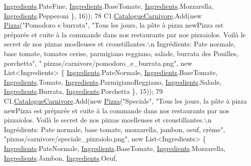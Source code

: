 \begin{DoxyCode}
      \hyperlink{namespaceModele_a001a8e89e56a724f24a249ba98080d41}{Ingredients}.PateFine, \hyperlink{namespaceModele_a001a8e89e56a724f24a249ba98080d41}{Ingredients}.BaseTomate, \hyperlink{namespaceModele_a001a8e89e56a724f24a249ba98080d41}{Ingredients}.Mozzarella, 
      \hyperlink{namespaceModele_a001a8e89e56a724f24a249ba98080d41}{Ingredients}.Pepperoni \}, 16));
78             C1.\hyperlink{classModele_1_1Catalogue_a4af9ef768f67cef6dfe545e22a6d63af}{CatalogueCarnivore}.Add(\textcolor{keyword}{new} \hyperlink{classModele_1_1Pizza}{Pizza}(\textcolor{stringliteral}{"Pomodoro e burrata"}, \textcolor{stringliteral}{"Tous les
       jours, la pâte à pizza newPizza est préparée et cuite à la commande dans nos restaurants par nos pizzaiolos.
       Voilà le secret de nos pizzas moelleuses et croustillantes.\(\backslash\)n Ingrédients: Pate normale, base tomate, tomates
       cerise, parmigiano reggiano, salade, burrata des Pouilles, porchetta"}, \textcolor{stringliteral}{"
      pizzas/carnivore/pomodoro\_e\_burrata.png"}, \textcolor{keyword}{new} List<Ingredients> \{ \hyperlink{namespaceModele_a001a8e89e56a724f24a249ba98080d41}{Ingredients}.PateNormale, \hyperlink{namespaceModele_a001a8e89e56a724f24a249ba98080d41}{Ingredients}.BaseTomate, 
      \hyperlink{namespaceModele_a001a8e89e56a724f24a249ba98080d41}{Ingredients}.Tomate, \hyperlink{namespaceModele_a001a8e89e56a724f24a249ba98080d41}{Ingredients}.ParmigianoReggiano, 
      \hyperlink{namespaceModele_a001a8e89e56a724f24a249ba98080d41}{Ingredients}.Salade, \hyperlink{namespaceModele_a001a8e89e56a724f24a249ba98080d41}{Ingredients}.Burrata, \hyperlink{namespaceModele_a001a8e89e56a724f24a249ba98080d41}{Ingredients}.Porchetta \}, 15));
79             C1.\hyperlink{classModele_1_1Catalogue_a4af9ef768f67cef6dfe545e22a6d63af}{CatalogueCarnivore}.Add(\textcolor{keyword}{new} \hyperlink{classModele_1_1Pizza}{Pizza}(\textcolor{stringliteral}{"Speciale"}, \textcolor{stringliteral}{"Tous les jours, la pâte
       à pizza newPizza est préparée et cuite à la commande dans nos restaurants par nos pizzaiolos. Voilà le
       secret de nos pizzas moelleuses et croustillantes.\(\backslash\)n Ingrédients: Pate normale, base tomate, mozzarella, jambon,
       oeuf, crème"}, \textcolor{stringliteral}{"pizzas/carnivore/speciale\_pizzaiolo.png"}, \textcolor{keyword}{new} List<Ingredients> \{ 
      \hyperlink{namespaceModele_a001a8e89e56a724f24a249ba98080d41}{Ingredients}.PateNormale, \hyperlink{namespaceModele_a001a8e89e56a724f24a249ba98080d41}{Ingredients}.BaseTomate, 
      \hyperlink{namespaceModele_a001a8e89e56a724f24a249ba98080d41}{Ingredients}.Mozzarella, \hyperlink{namespaceModele_a001a8e89e56a724f24a249ba98080d41}{Ingredients}.Jambon, \hyperlink{namespaceModele_a001a8e89e56a724f24a249ba98080d41}{Ingredients}.Oeuf, 

\end{DoxyCode}
